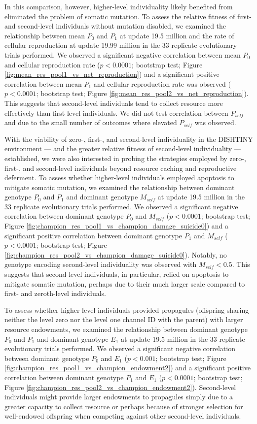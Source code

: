 In this comparison, however, higher-level individuality likely benefited from eliminated the problem of somatic mutation.
To assess the relative fitness of first- and second-level individuals without mutation disabled, we examined the relationship between mean $P_0$ and $P_1$ at update 19.5 million and the rate of cellular reproduction at update 19.99 million in the 33 replicate evolutionary trials performed.
We observed a significant negative correlation between mean $P_0$ and cellular reproduction rate ($p < 0.0001$; bootstrap test; Figure \ref{fig:mean_res_pool1_vs_net_reproduction}) and a significant positive correlation between mean $P_1$ and cellular reproduction rate was observed ($p < 0.0001$; bootstrap test; Figure \ref{fig:mean_res_pool2_vs_net_reproduction}).
This suggests that second-level individuals tend to collect resource more effectively than first-level individuals.
We did not test correlation between $P_{self}$ and due to the small number of outcomes where elevated $P_{self}$ was observed.

With the viability of zero-, first-, and second-level individuality in the DISHTINY environment --- and the greater relative fitness of second-level individuality --- established, we were also interested in probing the strategies employed by zero-, first-, and second-level individuals beyond resource caching and reproductive deferment.
To assess whether higher-level individuals employed apoptosis to mitigate somatic mutation, we examined the relationship between dominant genotype $P_0$ and $P_1$ and dominant genotype $M_{self}$ at update 19.5 million in the 33 replicate evolutionary trials performed.
We observed a significant negative correlation between dominant genotype $P_0$ and $M_{self}$ ($p < 0.0001$; bootstrap test; Figure \ref{fig:champion_res_pool1_vs_champion_damage_suicide0}) and a significant positive correlation between dominant genotype $P_1$ and $M_{self}$ ($p < 0.0001$; bootstrap test; Figure \ref{fig:champion_res_pool2_vs_champion_damage_suicide0}).
Notably, no genotype encoding second-level individuality was observed with $M_{self} < 0.5$.
This suggests that second-level individuals, in particular, relied on apoptosis to mitigate somatic mutation, perhaps due to their much larger scale compared to first- and zeroth-level individuals.

To assess whether higher-level individuals provided propagules (offspring sharing neither the level zero nor the level one channel ID with the parent) with larger resource endowments, we examined the relationship between dominant genotype $P_0$ and $P_1$ and dominant genotype $E_1$ at update 19.5 million in the 33 replicate evolutionary trials performed.
We observed a significant negative correlation between dominant genotype $P_0$ and $E_1$ ($p < 0.001$; bootstrap test; Figure \ref{fig:champion_res_pool1_vs_champion_endowment2}) and a significant positive correlation between dominant genotype $P_1$ and $E_1$ ($p <  0.0001$; bootstrap test; Figure \ref{fig:champion_res_pool2_vs_champion_endowment2}).
Second-level individuals might provide larger endowments to propagules simply due to a greater capacity to collect resource or perhaps because of stronger selection for well-endowed offspring when competing against other second-level individuals.

